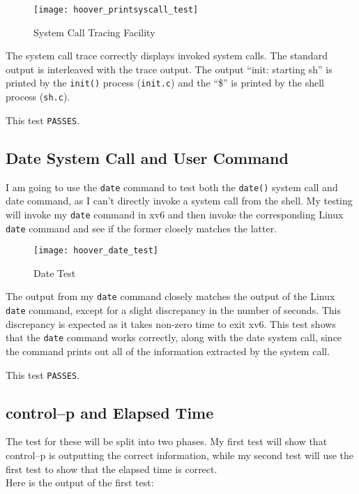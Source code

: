 \documentclass[11pt,letterpaper]{report}
\begin{document}
\begin{figure}[h!]
	\centering
	\texttt{[image: hoover\_printsyscall\_test]}
	\caption[Syscall Trace]{System Call Tracing Facility}
	\label{fig:hooverprintsyscalltest}
\end{figure}
	
	The system call trace correctly displays invoked system calls. The standard output is interleaved with the trace output. The output ``init: starting sh'' is printed by the {\tt init()} process ({\tt init.c}) and the ``\$'' is printed by the shell process ({\tt sh.c}).
	
	This test {\tt PASSES}.

\newpage	
	\subsection*{Date System Call and User Command}
	I am going to use the {\tt date} command to test both the {\tt date()} system call and date command, as I can't directly invoke a system call from the shell. My testing will invoke my {\tt date} command in xv6 and then invoke the corresponding Linux {\tt date} command and see if the former closely matches the latter. 
	
\begin{figure}[h!]
	\centering
	\texttt{[image: hoover\_date\_test]}
	\caption[Date test]{Date Test}
	\label{fig:hooverdatetest}
\end{figure}
	
	The output from my {\tt date} command closely matches the output of the Linux {\tt date} command, except for a slight discrepancy in the number of seconds. This discrepancy is expected as it takes non-zero time to exit xv6. This test shows that the {\tt date} command works correctly, along with the date system call, since the command prints out all of the information extracted by the system call.
	
	This test {\tt PASSES}.
	
	\subsection*{control--p and Elapsed Time}
	The test for these will be split into two phases. My first test will show that control--p is outputting the correct information, while my second test will use the first test to show that the elapsed time is correct. \\
	
	\noindent Here is the output of the first test:
\end{document}
